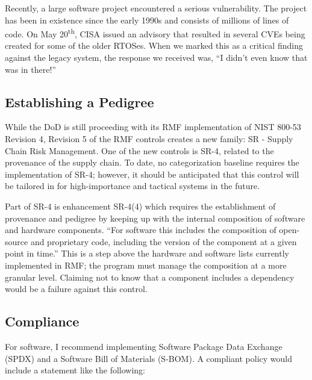 Recently, a large software project encountered a serious vulnerability. The project has been in existence since the early 1990s and consists of millions of lines of code. On May 20\textsuperscript{th}, CISA issued an advisory that resulted in several CVEs being created for some of the older RTOSes.\autocite{20210705:ics21-119-04} When we marked this as a critical finding against the legacy system, the response we received was, ``I didn't even know that was in there!''

\subsection{Establishing a Pedigree}

While the DoD is still proceeding with its RMF implementation of NIST 800-53 Revision 4, Revision 5 of the RMF controls creates a new family: SR - Supply Chain Risk Management. One of the new controls is SR-4, related to the provenance of the supply chain. To date, no categorization baseline requires the implementation of SR-4; however, it should be anticipated that this control will be tailored in for high-importance and tactical systems in the future. 

Part of SR-4 is enhancement SR-4(4) which requires the establishment of provenance and pedigree by keeping up with the internal composition of software and hardware components. ``For software this includes the composition of open-source and proprietary code, including the version of the component at a given point in time.''\autocite[\pno~66]{20210705:nist80053rev5} This is a step above the hardware and software lists currently implemented in RMF; the program must manage the composition at a more granular level. Claiming not to know that a component includes a dependency would be a failure against this control.

\subsection{Compliance}

For software, I recommend implementing Software Package Data Exchange (SPDX) and a Software Bill of Materials (S-BOM). A compliant policy would include a statement like the following:

